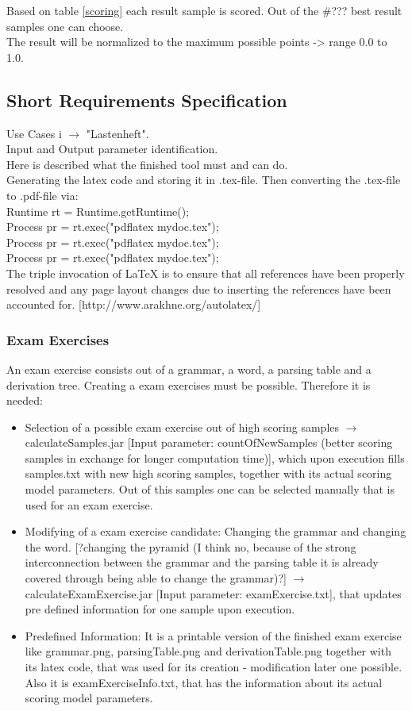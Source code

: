 \noindent Based on table \ref{scoring} each result sample is scored. Out of the \#??? best result samples one can choose.\\
The result will be normalized to the maximum possible points -> range 0.0 to 1.0. 


\subsection{Short Requirements Specification}
Use Cases i $\longrightarrow$ "Lastenheft".\\
Input and Output parameter identification.\\
Here is described what the finished tool must and can do.\\

\noindent Generating the latex code and storing it in .tex-file. Then converting the .tex-file to .pdf-file via:\\
Runtime rt = Runtime.getRuntime();\\
Process pr = rt.exec("pdflatex mydoc.tex");\\
Process pr = rt.exec("pdflatex mydoc.tex");\\
Process pr = rt.exec("pdflatex mydoc.tex");\\
The triple invocation of LaTeX is to ensure that all references have been properly resolved and any page layout changes due to inserting the references have been accounted for. [http://www.arakhne.org/autolatex/]

\subsubsection{Exam Exercises}
An exam exercise consists out of a grammar, a word, a parsing table and a derivation tree. Creating a exam exercises must be possible. Therefore it is needed:
\begin{itemize}
	\item Selection of a possible exam exercise out of high scoring samples $\longrightarrow$ calculateSamples.jar [Input parameter: countOfNewSamples (better scoring samples in exchange for longer computation time)], which upon execution fills samples.txt with new high scoring samples, together with its actual scoring model parameters. Out of this samples one can be selected manually that is used for an exam exercise.
	\item Modifying of a exam exercise candidate: Changing the grammar and changing the word. [?changing the pyramid (I think no, because of the strong interconnection between the grammar and the parsing table it is already covered through being able to change the grammar)?] $\longrightarrow$ calculateExamExercise.jar [Input parameter: examExercise.txt], that updates pre defined information for one sample upon execution.
	\item Predefined Information: It is a printable version of the finished exam exercise like grammar.png, parsingTable.png and derivationTable.png together with its latex code, that was used for its creation - modification later one possible. Also it is examExerciseInfo.txt, that has the information about its actual scoring model parameters. 
\end{itemize}

